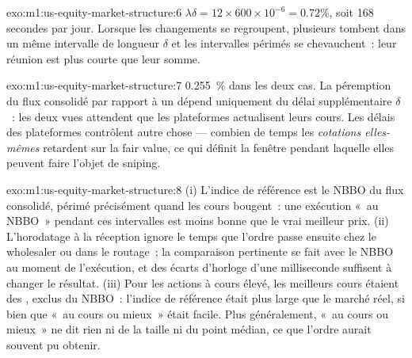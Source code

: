 \begin{solution}{exo:m1:us-equity-market-structure:6}
$\lambda\delta = 12 \times 600\times10^{-6} = 0.72\%$, soit 168 secondes par
jour. Lorsque les changements se regroupent, plusieurs tombent dans un même intervalle de longueur
$\delta$ et les intervalles périmés se chevauchent~: leur réunion est plus courte que leur
somme.
\end{solution}

\begin{solution}{exo:m1:us-equity-market-structure:7}
0.255~\% dans les deux cas. La péremption du flux consolidé par rapport à un  dépend
uniquement du délai supplémentaire $\delta$~: les deux vues attendent que les plateformes actualisent leurs cours.
Les délais des plateformes contrôlent autre chose --- combien de temps les \emph{cotations
elles-mêmes} retardent sur la fair value, ce qui définit la fenêtre pendant laquelle elles peuvent
faire l'objet de sniping.
\end{solution}

\begin{solution}{exo:m1:us-equity-market-structure:8}
(i) L'indice de référence est le NBBO du flux consolidé, périmé précisément quand les cours bougent~:
une exécution «~au NBBO~» pendant ces intervalles est moins bonne que le
vrai meilleur prix. (ii) L'horodatage à la réception ignore le temps que l'ordre passe ensuite
chez le wholesaler ou dans le routage~; la comparaison pertinente se fait avec le NBBO
au moment de l'exécution, et des écarts d'horloge d'une milliseconde suffisent à changer le résultat.
(iii) Pour les actions à cours élevé, les meilleurs cours étaient des , exclus du
NBBO~: l'indice de référence était plus large que le marché réel, si bien que «~au cours ou mieux~» était
facile. Plus généralement, «~au cours ou mieux~» ne dit rien ni de la taille ni du
point médian, ce que l'ordre aurait souvent pu obtenir.
\end{solution}

